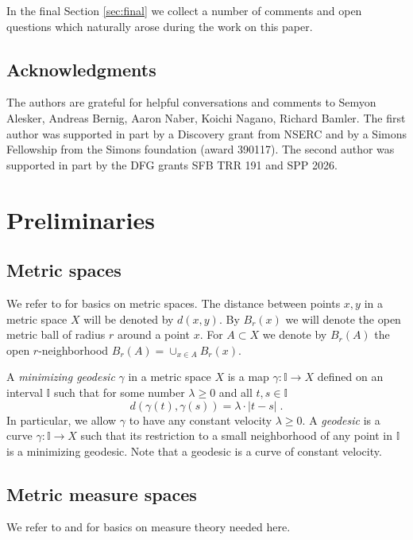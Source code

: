 \documentclass[12pt,leqno,intlimits]{amsart}
\numberwithin{equation}{section}
\theoremstyle{definition}
\theoremstyle{remark}
\def\:{\colon}
\begin{document}
In the final Section \ref{sec:final} we collect a number of comments and  open questions which naturally arose during the work on this paper.




\subsection{Acknowledgments}  The authors are grateful for helpful conversations  and comments to  Semyon Alesker, Andreas Bernig, Aaron Naber, Koichi Nagano, Richard Bamler.
The first author was supported in part by a Discovery grant from NSERC and by  a Simons Fellowship from the Simons foundation (award 390117). The second author was supported in part by the DFG grants  SFB TRR 191 and SPP 2026.


\section{Preliminaries} \label{sec:prelim}
\subsection{Metric spaces}
We refer to \cite{BBI01} for basics on metric spaces.
The distance between points $x,y$ in a metric space $X$ will be denoted by $d(x,y)$.
By $B_r(x)$ we will denote the open metric ball of radius $r$ around a point $x$. For $A\subset X$
we denote by $B_r (A)$ the open $r$-neighborhood $B_r (A) =\cup _{x\in A} B_r (x)$.


A \emph {minimizing geodesic} $\gamma$ in a metric space $X$ is  a map $\gamma  \: \mathbb I\to X$ defined on  an interval $\mathbb I$  such that for some number $\lambda \geq 0$  and all $t,s\in \mathbb I$
$$ d(\gamma (t),\gamma (s)) =\lambda \cdot |t-s| \;.$$
 In particular, we allow $\gamma$ to have any constant velocity $\lambda \geq 0$.
A \emph{geodesic} is a curve $\gamma\: \mathbb I\to X$ such that its restriction to a small neighborhood of any point in $\mathbb I$ is  a minimizing geodesic. Note that a  geodesic is a curve of constant velocity.

\subsection{Metric measure spaces} We refer to \cite{Federer} and \cite{Evans} for basics on measure theory needed here.
\end{document}
